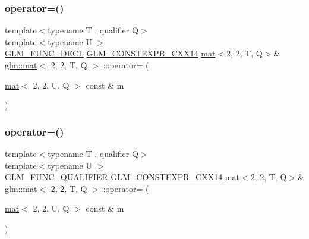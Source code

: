 \mbox{\label{structglm_1_1mat_3_012_00_012_00_01_t_00_01_q_01_4_a5b25b3f234873c4246a76fa03f7c83ef}} 
\subsubsection{\texorpdfstring{operator=()}{operator=()}\hspace{0.1cm}{\footnotesize\ttfamily [2/3]}}
{\footnotesize\ttfamily template$<$typename T , qualifier Q$>$ \\
template$<$typename U $>$ \\
\mbox{\hyperlink{setup_8hpp_ab2d052de21a70539923e9bcbf6e83a51}{G\+L\+M\+\_\+\+F\+U\+N\+C\+\_\+\+D\+E\+CL}} \mbox{\hyperlink{setup_8hpp_a4dd12abf5e1164bc57f3a34671d03844}{G\+L\+M\+\_\+\+C\+O\+N\+S\+T\+E\+X\+P\+R\+\_\+\+C\+X\+X14}} \mbox{\hyperlink{structglm_1_1mat}{mat}}$<$2, 2, T, Q$>$\& \mbox{\hyperlink{structglm_1_1mat}{glm\+::mat}}$<$ 2, 2, T, Q $>$\+::operator= (\begin{DoxyParamCaption}\item[{\mbox{\hyperlink{structglm_1_1mat}{mat}}$<$ 2, 2, U, Q $>$ const \&}]{m }\end{DoxyParamCaption})}

\mbox{\label{structglm_1_1mat_3_012_00_012_00_01_t_00_01_q_01_4_a1819564bc86b8cc5a855482bdfcb88d7}} 
\subsubsection{\texorpdfstring{operator=()}{operator=()}\hspace{0.1cm}{\footnotesize\ttfamily [3/3]}}
{\footnotesize\ttfamily template$<$typename T , qualifier Q$>$ \\
template$<$typename U $>$ \\
\mbox{\hyperlink{setup_8hpp_a33fdea6f91c5f834105f7415e2a64407}{G\+L\+M\+\_\+\+F\+U\+N\+C\+\_\+\+Q\+U\+A\+L\+I\+F\+I\+ER}} \mbox{\hyperlink{setup_8hpp_a4dd12abf5e1164bc57f3a34671d03844}{G\+L\+M\+\_\+\+C\+O\+N\+S\+T\+E\+X\+P\+R\+\_\+\+C\+X\+X14}} \mbox{\hyperlink{structglm_1_1mat}{mat}}$<$2, 2, T, Q$>$\& \mbox{\hyperlink{structglm_1_1mat}{glm\+::mat}}$<$ 2, 2, T, Q $>$\+::operator= (\begin{DoxyParamCaption}\item[{\mbox{\hyperlink{structglm_1_1mat}{mat}}$<$ 2, 2, U, Q $>$ const \&}]{m }\end{DoxyParamCaption})}



